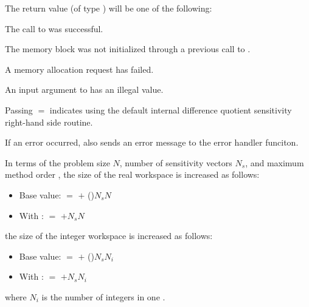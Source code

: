 {
  The return value  (of type ) will be one of the following:
  \begin{args}
  \item[\Id{CV\_SUCCESS}]
    The call to  was successful.
  \item[\Id{CV\_MEM\_NULL}] 
    The {\cvodes} memory block was not initialized through a 
    previous call to .
  \item[\Id{CV\_MEM\_FAIL}] 
    A memory allocation request has failed.
  \item[\Id{CV\_ILL\_INPUT}] 
    An input argument to  has an illegal value.
  \end{args}
}
{
  Passing $=$ indicates using the default internal difference 
  quotient sensitivity right-hand side routine.

  If an error occurred,  also sends an error message to the
  error handler funciton.
}
In terms of the problem size $N$, number of sensitivity vectors $N_s$, and maximum method 
order , the size of the real workspace is increased as follows:
\begin{itemize}
\item Base value:  $=$  $+$ ()$N_s N$
\item With :  $=$  $+ N_s N$ 
\end{itemize}
the size of the integer workspace is increased as follows:
\begin{itemize}
\item Base value:  $=$  $+$ ()$N_s N_i$
\item With :  $=$  $+ N_s N_i$ 
\end{itemize}
where $N_i$ is the number of integers in one .

